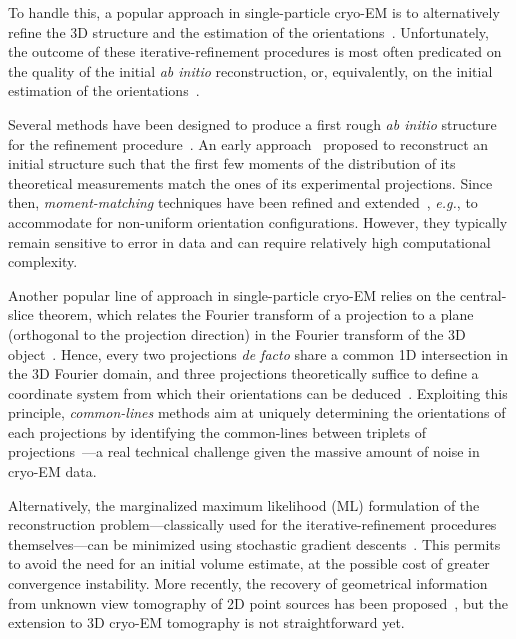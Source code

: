 To handle this, a popular approach in single-particle cryo-EM is to alternatively refine the 3D structure and the estimation of the orientations~\cite{penczek1994ribosome,Baker1996,Dempster1977,sigworth1998maximum,scheres2012bayesian,zehni2020joint}. Unfortunately, the outcome of these iterative-refinement procedures is most often predicated on the quality of the initial \textit{ab initio} reconstruction, or, equivalently, on the initial estimation of the orientations~\cite{sorzano2006optimization,henderson2012outcome}.

Several methods have been designed to produce a first rough \textit{ab initio} structure for the refinement procedure~\cite{singer2020computational}. An early approach~\cite{kam1980reconstruction} proposed to reconstruct an initial structure such that the first few moments of the distribution of its theoretical measurements match the ones of its experimental projections. Since then, \textit{moment-matching} techniques have been refined and extended~\cite{salzman1990method,goncharov1988integral,sharon2019method}, \textit{e.g.}, to accommodate for non-uniform orientation configurations. However, they typically remain sensitive to error in data and can require relatively high computational complexity.  %

Another popular line of approach in single-particle cryo-EM  relies on the central-slice theorem, which relates the Fourier transform of a projection to a plane (orthogonal to the projection direction) in the Fourier transform of the 3D object~\cite{Natterer2001mathematics}. Hence, every two projections \textit{de facto} share a common 1D intersection in the 3D Fourier domain, and three projections theoretically suffice to define a coordinate system from which their orientations can be deduced~\cite{van1987angular}. Exploiting this principle, \textit{common-lines} methods aim at uniquely determining the orientations of each projections by identifying the common-lines between triplets of projections~\cite{penczek1994ribosome,mallick2006structure,singer2010detecting,wang2013orientation,greenberg2017common,pragier2019common}---a real technical challenge given the massive amount of noise in cryo-EM data. %

Alternatively, the  marginalized maximum likelihood (ML) formulation of the reconstruction problem---classically used for the iterative-refinement procedures themselves---can be minimized using stochastic gradient descents~\cite{punjani2017cryosparc}. This permits to avoid the need for an initial volume estimate, at the possible cost of greater convergence instability. More recently, the recovery of geometrical information from unknown view tomography of 2D point sources has been proposed~\cite{zehni2019distance}, but the extension to 3D cryo-EM tomography is not straightforward yet.

